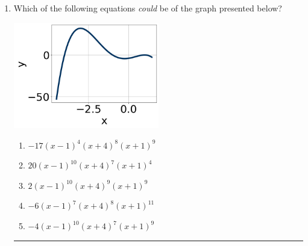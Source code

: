 \documentclass[14pt]{extbook}
\newcommand{\litem}[1]{\item#1\hspace*{-1cm}\rule{\textwidth}{0.4pt}}
\begin{document}
\begin{enumerate}
{\begin{enumerate}[label=\Alph*.]
\end{enumerate} }
\litem{
Which of the following equations \textit{could} be of the graph presented below?
\begin{center}
    \includegraphics[width=0.5\textwidth]{../Figures/polyGraphToFunctionCopyB.png}
\end{center}
\begin{enumerate}[label=\Alph*.]
\item \( -17(x - 1)^{4} (x + 4)^{8} (x + 1)^{9} \)
\item \( 20(x - 1)^{10} (x + 4)^{7} (x + 1)^{4} \)
\item \( 2(x - 1)^{10} (x + 4)^{9} (x + 1)^{9} \)
\item \( -6(x - 1)^{7} (x + 4)^{8} (x + 1)^{11} \)
\item \( -4(x - 1)^{10} (x + 4)^{7} (x + 1)^{9} \)


\end{enumerate}}
\end{enumerate}
\end{document}
